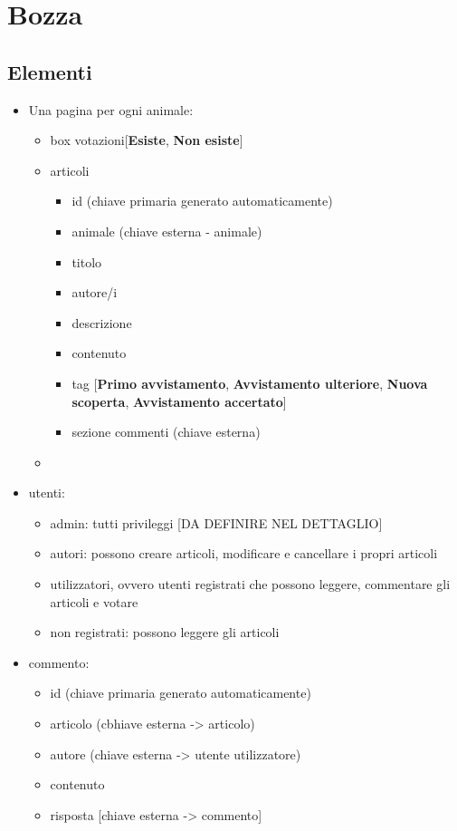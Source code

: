 \section{Bozza}

\subsection{Elementi}
    \begin{itemize}
        \item Una pagina per ogni animale:
        \begin{itemize}
            \item box votazioni[\textbf{Esiste}, \textbf{Non esiste}]
            \item articoli
            \begin{itemize}
                \item id (chiave primaria generato automaticamente)
                \item animale (chiave esterna -\> animale)
                \item titolo
                \item autore/i
                \item descrizione
                \item contenuto
                \item tag [\textbf{Primo avvistamento}, \textbf{Avvistamento ulteriore}, \textbf{Nuova scoperta}, \textbf{Avvistamento accertato}]
                \item sezione commenti (chiave esterna)
            \end{itemize}
            \item 
        \end{itemize}

        \item utenti:
        \begin{itemize}
            \item admin: tutti privileggi [DA DEFINIRE NEL DETTAGLIO]
            \item autori: possono creare articoli, modificare e cancellare i propri articoli
            \item utilizzatori, ovvero utenti registrati che possono leggere, commentare gli articoli e votare
            \item non registrati: possono leggere gli articoli
        \end{itemize}

        \item commento:
        \begin{itemize}
            \item id (chiave primaria generato automaticamente)
            \item articolo (cbhiave esterna -> articolo)
            \item autore (chiave esterna -> utente utilizzatore)
            \item contenuto
            \item risposta [chiave esterna -> commento]
        \end{itemize}


\end{itemize}
